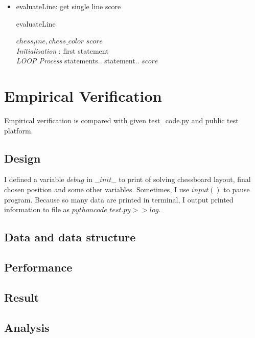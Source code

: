\documentclass[conference,compsoc]{IEEEtran}
\renewcommand{\algorithmicrequire}{\textbf{Input:}}
\renewcommand{\algorithmicensure}{\textbf{Output:}}
\begin{document}
\begin{itemize}
   \item evaluateLine: get single line score
     \begin{algorithm}[H]
     \caption{evaluateLine}
     \begin{algorithmic}[4]
     \renewcommand{\algorithmicrequire}{\textbf{Input:}}
     \renewcommand{\algorithmicensure}{\textbf{Output:}}
     \REQUIRE $chess_line, chess\_color$
     \ENSURE  $score$
     \\ \textit{Initialisation} :
     \STATE first statement
     \\ \textit{LOOP Process}
     \STATE statements..
     \STATE statement..
     \ENDIF
     \ENDFOR
     \RETURN $score$
     \end{algorithmic}
     \end{algorithm}

\end{itemize}


\section{Empirical Verification}
Empirical verification is compared with given test\_code.py and public test
platform.

\subsection{Design}

I defined a variable $debug$ in $\_\_init\_\_$ to print of solving chessboard
layout, final chosen position and some other variables. Sometimes, I use
$input()$ to pause program. Because so many data are printed in terminal, I
output printed information to file as $python code\_test.py >> log$.

\subsection{Data and data structure}


\subsection{Performance}

\subsection{Result}

\subsection{Analysis}
\end{document}

